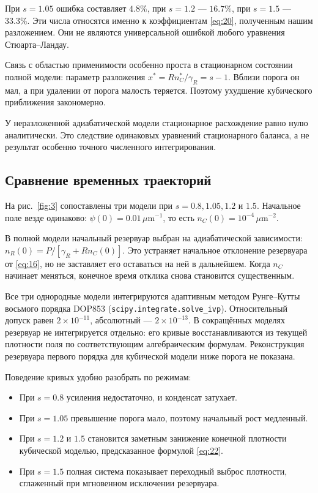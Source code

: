 \documentclass[12pt,a4paper]{article}
\begin{document}
При $s=1.05$ ошибка составляет $4.8\%$, при $s=1.2$ --- $16.7\%$, при $s=1.5$ --- $33.3\%$. Эти числа относятся именно к коэффициентам \eqref{eq:20}, полученным нашим разложением. Они не являются универсальной ошибкой любого уравнения Стюарта--Ландау.

Связь с областью применимости особенно проста в стационарном состоянии полной модели: параметр разложения $x^{*}=R n_{C}^{*}/\gamma_{R}=s-1$. Вблизи порога он мал, а при удалении от порога малость теряется. Поэтому ухудшение кубического приближения закономерно.

У неразложенной адиабатической модели стационарное расхождение равно нулю аналитически. Это следствие одинаковых уравнений стационарного баланса, а не результат особенно точного численного интегрирования.

\subsection{Сравнение временных траекторий}\label{sec:4.5}

На рис.~\ref{fig:3} сопоставлены три модели при $s=0.8, 1.05, 1.2$ и $1.5$. Начальное поле везде одинаково: $\psi(0)=0.01\,\mu\mathrm m^{-1}$, то есть $n_{C}(0)=10^{-4}\,\mu\mathrm m^{-2}$.

В полной модели начальный резервуар выбран на адиабатической зависимости: $n_{R}(0)=P/[\gamma_{R}+R n_{C}(0)]$. Это устраняет начальное отклонение резервуара от \eqref{eq:16}, но не заставляет его оставаться на ней в дальнейшем. Когда $n_{C}$ начинает меняться, конечное время отклика снова становится существенным.

Все три однородные модели интегрируются адаптивным методом Рунге--Кутты восьмого порядка DOP853 (\texttt{scipy.integrate.solve\_ivp}). Относительный допуск равен $2\times10^{-11}$, абсолютный --- $2\times10^{-13}$. В сокращённых моделях резервуар не интегрируется отдельно: его кривые восстанавливаются из текущей плотности поля по соответствующим алгебраическим формулам. Реконструкция резервуара первого порядка для кубической модели ниже порога не показана.

Поведение кривых удобно разобрать по режимам:

\begin{itemize}\raggedright\setlength{\itemsep}{3pt}\setlength{\parsep}{0pt}

\item При $s=0.8$ усиления недостаточно, и конденсат затухает.

\item При $s=1.05$ превышение порога мало, поэтому начальный рост медленный.

\item При $s=1.2$ и $1.5$ становится заметным занижение конечной плотности кубической моделью, предсказанное формулой \eqref{eq:22}.

\item При $s=1.5$ полная система показывает переходный выброс плотности, сглаженный при мгновенном исключении резервуара.

\end{itemize}
\end{document}
